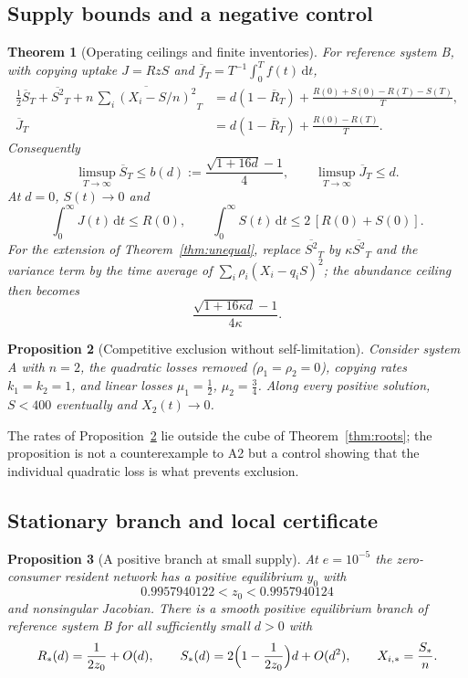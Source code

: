 \documentclass[11pt,a4paper]{article}
\theoremstyle{plain}
\newtheorem{theorem}{Theorem}[section]
\newtheorem{proposition}[theorem]{Proposition}
\theoremstyle{definition}
\theoremstyle{remark}
\newcommand{\avg}[1]{\overline{#1}_T}
\newcommand{\dd}{\mathrm d}
\begin{document}
\subsection{Supply bounds and a negative control}
\begin{theorem}[Operating ceilings and finite inventories]\label{thm:supply}
For reference system B, with copying uptake $J=RzS$ and $\avg f=T^{-1}\int_0^Tf(t)\,\dd t$,
\begin{align}
\tfrac12\avg S+\avg{S^2}+n\,\overline{\textstyle\sum_i(X_i-S/n)^2}_T
&=d(1-\avg R)+\frac{R(0)+S(0)-R(T)-S(T)}T,\label{eq:avgbalance}\\
\avg J&=d(1-\avg R)+\frac{R(0)-R(T)}T.\label{eq:uptake}
\end{align}
Consequently
\begin{equation}\label{eq:ceilings}
\limsup_{T\to\infty}\avg S\le b(d):=\frac{\sqrt{1+16d}-1}4,\qquad
\limsup_{T\to\infty}\avg J\le d.
\end{equation}
At $d=0$, $S(t)\to0$ and
\begin{equation}\label{eq:budgets}
\int_0^\infty J(t)\,\dd t\le R(0),\qquad
\int_0^\infty S(t)\,\dd t\le2\,[R(0)+S(0)].
\end{equation}
For the extension of Theorem~\ref{thm:unequal}, replace $\avg{S^2}$ by $\kappa\avg{S^2}$ and the variance term by the time average of $\sum_i\rho_i(X_i-q_iS)^2$; the abundance ceiling then becomes
\[
\frac{\sqrt{1+16\kappa d}-1}{4\kappa}.
\]
\end{theorem}

\begin{proposition}[Competitive exclusion without self-limitation]\label{prop:negative}
Consider system A with $n=2$, the quadratic losses removed ($\rho_1=\rho_2=0$), copying rates $k_1=k_2=1$, and linear losses $\mu_1=\tfrac12$, $\mu_2=\tfrac34$. Along every positive solution, $S<400$ eventually and $X_2(t)\to0$.
\end{proposition}
The rates of Proposition~\ref{prop:negative} lie outside the cube of Theorem~\ref{thm:roots}; the proposition is not a counterexample to A2 but a control showing that the individual quadratic loss is what prevents exclusion.

\subsection{Stationary branch and local certificate}
\begin{proposition}[A positive branch at small supply]\label{prop:branch}
At $e=10^{-5}$ the zero-consumer resident network has a positive equilibrium $y_0$ with
\[
0.9957940122<z_0<0.9957940124
\]
and nonsingular Jacobian. There is a smooth positive equilibrium branch of reference system B for all sufficiently small $d>0$ with
\begin{equation}\label{eq:branch}
R_*(d)=\frac1{2z_0}+O(d),\qquad
S_*(d)=2\Bigl(1-\frac1{2z_0}\Bigr)d+O(d^2),\qquad X_{i,*}=\frac{S_*}n.
\end{equation}
\end{proposition}
\end{document}
